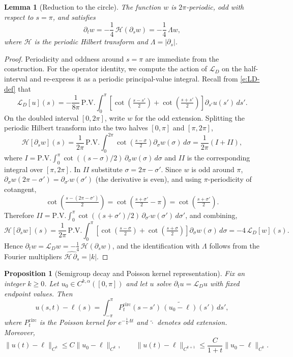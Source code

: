 \documentclass{amsart}
\newtheorem{proposition}[theorem]{Proposition}
\newtheorem{lemma}[theorem]{Lemma}
\begin{document}
\begin{lemma}[Reduction to the circle]
\label{lem:circle-reduction}
The function $w$ is $2\pi$-periodic, odd with respect to $s=\pi$, and satisfies
\[
\partial_t w
=
-\frac14\,\mathcal{H}(\partial_s w)
=
-\frac14\,\Lambda w,
\]
where $\mathcal{H}$ is the periodic Hilbert transform and $\Lambda=|\partial_s|$.
\end{lemma}

\begin{proof}
Periodicity and oddness around $s=\pi$ are immediate from the construction. For the operator identity, we compute the action of $\mathcal{L}_D$ on the half-interval and re-express it as a periodic principal-value integral. Recall from \eqref{e:LD-def} that
\[
\mathcal{L}_D[u](s)
= -\frac{1}{8\pi}\,\mathrm{P.V.}\!\int_0^\pi
\left[\cot\!\left(\tfrac{s-s'}{2}\right)+\cot\!\left(\tfrac{s+s'}{2}\right)\right]
\partial_{s'}u(s')\,ds'.
\]
On the doubled interval $[0,2\pi]$, write $w$ for the odd extension. Splitting the periodic Hilbert transform into the two halves $[0,\pi]$ and $[\pi,2\pi]$,
\[
\mathcal{H}[\partial_s w](s)
= \frac{1}{2\pi}\,\mathrm{P.V.}\!\int_0^{2\pi}
\cot\!\left(\tfrac{s-\sigma}{2}\right) \partial_\sigma w(\sigma)\,d\sigma
= \frac{1}{2\pi}(I+II),
\]
where $I=\mathrm{P.V.}\int_0^\pi \cot((s-\sigma)/2)\,\partial_\sigma w(\sigma)\,d\sigma$ and $II$ is the corresponding integral over $[\pi,2\pi]$. In $II$ substitute $\sigma = 2\pi - \sigma'$. Since $w$ is odd around $\pi$, $\partial_\sigma w(2\pi-\sigma') = \partial_{\sigma'}w(\sigma')$ (the derivative is even), and using $\pi$-periodicity of cotangent,
\[
\cot\!\left(\tfrac{s-(2\pi-\sigma')}{2}\right)
= \cot\!\left(\tfrac{s+\sigma'}{2}-\pi\right)
= \cot\!\left(\tfrac{s+\sigma'}{2}\right).
\]
Therefore $II = \mathrm{P.V.}\int_0^\pi \cot((s+\sigma')/2)\,\partial_{\sigma'}w(\sigma')\,d\sigma'$, and combining,
\[
\mathcal{H}[\partial_s w](s)
= \frac{1}{2\pi}\,\mathrm{P.V.}\!\int_0^\pi
\left[\cot\!\left(\tfrac{s-\sigma}{2}\right)+\cot\!\left(\tfrac{s+\sigma}{2}\right)\right]
\partial_\sigma w(\sigma)\,d\sigma
= -4\,\mathcal{L}_D[w](s).
\]
Hence $\partial_t w = \mathcal{L}_D w = -\tfrac14\,\mathcal{H}(\partial_s w)$, and the identification with $\Lambda$ follows from the Fourier multipliers $\widehat{\mathcal{H}\,\partial_s} = |k|$.
\end{proof}

\begin{proposition}[Semigroup decay and Poisson kernel representation]
\label{prop:LD-decay}
Fix an integer $k\ge0$. Let $u_0\in C^{k,\alpha}([0,\pi])$ and let $u$ solve
$\partial_t u=\mathcal{L}_D u$ with fixed endpoint values.
Then
\[
u(s,t)-\ell(s)
=
\int_{-\pi}^{\pi}
P^{\mathrm{circ}}_t(s-s')\,\widetilde{(u_0-\ell)}(s')\,ds',
\]
where $P^{\mathrm{circ}}_t$ is the Poisson kernel for
$e^{-\frac14\Lambda t}$ and $\widetilde{\cdot}$ denotes odd extension.
Moreover,
\[
\|u(t)-\ell\|_{C^k}\le C\|u_0-\ell\|_{C^k},
\qquad
\|u(t)-\ell\|_{C^{k+1}}\le \frac{C}{1+t}\|u_0-\ell\|_{C^k}.
\]
\end{proposition}
\end{document}
